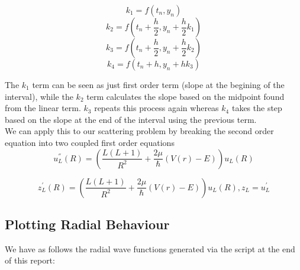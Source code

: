 \documentclass[11pt]{article} %
\begin{document}
\begin{equation}
k_1=f(t_n,y_n)
\end{equation}
\begin{equation}
k_2=f(t_n+\frac{h}{2},y_n+\frac{h}{2}k_1)
\end{equation}
\begin{equation}
k_3=f(t_n+\frac{h}{2},y_n+\frac{h}{2}k_2)
\end{equation}
\begin{equation}
k_4=f(t_n+h,y_n+hk_3)
\end{equation}

The $k_1$ term can be seen as just first order term (slope at the begining of the interval), while the $k_2$ term calculates the slope based on the midpoint found from the linear term.  
$k_3$ repeats this process again whereas $k_4$ takes the step based on the slope at the end of the interval using the previous term. \\
We can apply this to our scattering problem by breaking the second order equation into two coupled first order equations
\begin{equation}
u_{L}^{''}(R)=\left(\frac{L(L+1)}{R^2}+\frac{2\mu}{\hbar}(V(r)-E)\right)u_{L}(R)
\end{equation}

\begin{equation}
z_{L}^{'}(R)=\left(\frac{L(L+1)}{R^2}+\frac{2\mu}{\hbar}(V(r)-E)\right)u_{L}(R),
z_{L}=u_{L}^{'}
\end{equation}

\newpage
\subsection{Plotting Radial Behaviour}
We have as follows the radial wave functions generated via the script at the end of this report:\\
\end{document}
